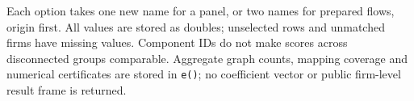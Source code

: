 \documentclass[11pt]{article}
\begin{document}
Each option takes one new name for a panel, or two names for prepared flows,
origin first. All values are stored as doubles; unselected rows and unmatched
firms have missing values. Component IDs do not make scores across disconnected
groups comparable. Aggregate graph counts, mapping coverage and numerical
certificates are stored in \texttt{e()}; no coefficient vector or public
firm-level result frame is returned.

\begingroup
\small
\setlength{\bibsep}{1.5pt}


\endgroup
\end{document}
